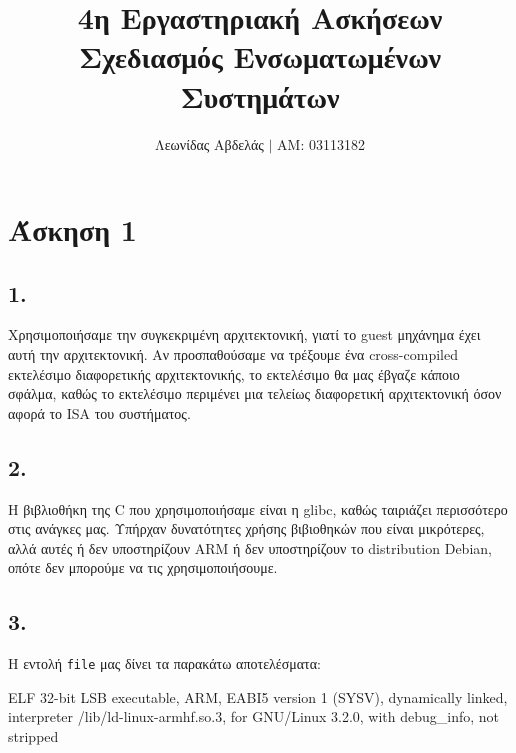 \documentclass{article}
\title{4η Εργαστηριακή Ασκήσεων \\
        Σχεδιασμός Ενσωματωμένων Συστημάτων}
\newcommand{\english}[1]{\foreignlanguage{english}{{#1}}}
\begin{document}
\date{}
\author{Λεωνίδας Αβδελάς $|$ ΑΜ: 03113182}

\maketitle
\newpage

\section*{Άσκηση 1}
\subsection*{1.}

Χρησιμοποιήσαμε την συγκεκριμένη αρχιτεκτονική, γιατί το \english{guest} μηχάνημα έχει αυτή την αρχιτεκτονική. Αν προσπαθούσαμε να τρέξουμε ένα \english{cross-compiled} εκτελέσιμο διαφορετικής αρχιτεκτονικής, το εκτελέσιμο θα μας έβγαζε κάποιο σφάλμα, καθώς το εκτελέσιμο περιμένει μια τελείως διαφορετική αρχιτεκτονική όσον αφορά το \english{ISA} του συστήματος. 

\subsection*{2.}

Η βιβλιοθήκη της \english{C} που χρησιμοποιήσαμε είναι η \english{glibc}, καθώς ταιριάζει περισσότερο στις ανάγκες μας. Υπήρχαν δυνατότητες χρήσης βιβιοθηκών που είναι μικρότερες, αλλά αυτές ή δεν υποστηρίζουν \english{ARM} ή δεν υποστηρίζουν το \english{distribution Debian}, οπότε δεν μπορούμε να τις χρησιμοποιήσουμε.

\subsection*{3.}


Η εντολή \english{\texttt{file}} μας δίνει τα παρακάτω αποτελέσματα:


\begin{otherlanguage}{english}
    \begin{tcolorbox}[width=\linewidth, colback={backcolour}, colupper=black]
        ELF 32-bit LSB executable, ARM, EABI5 version 1 (SYSV), dynamically linked, interpreter /lib/ld-linux-armhf.so.3, for GNU/Linux 3.2.0, with debug\_info, not stripped
    \end{tcolorbox}
\end{otherlanguage}
\end{document}
